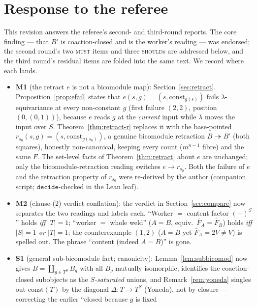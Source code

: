 \documentclass[11pt]{article}
\newcommand{\const}{\mathrm{const}}
\theoremstyle{plain}
\theoremstyle{definition}
\theoremstyle{remark}
\begin{document}
\section{Response to the referee}\label{sec:response}

This revision answers the referee's second- and third-round reports. The core finding --- that
$B'$ is coaction-closed and is the worker's reading --- was endorsed; the second round's two
\textsc{must} items and three \textsc{should}s are addressed below, and the third round's
residual items are folded into the same text. We record where each lands.

\begin{itemize}[leftmargin=1.5em]
\item \textbf{M1} (the retract $e$ is not a bicomodule map): Section~\ref{sec:retract}.
  Proposition~\ref{prop:efail} states that $e(s,g)=(s,\const_{g(s)})$ fails
  $\lambda$-equivariance at every non-constant $g$ (first failure $(2,2)$, position
  $(0,(0,1))$), because $e$ reads $g$ at the \emph{current} input while $\lambda$ moves the
  input over $S$. Theorem~\ref{thm:retract-r} replaces it with the base-pointed
  $r_{s_0}(s,g)=(s,\const_{g(s_0)})$, a genuine bicomodule retraction
  $B\twoheadrightarrow B'$ (both squares), honestly non-canonical, keeping every count
  ($m^{n-1}$ fibre) and the same $\bar F$. The set-level facts of Theorem~\ref{thm:retract}
  about $e$ are unchanged; only the bicomodule-retraction reading switches $e\to r_{s_0}$.
  Both the failure of $e$ and the retraction property of $r_{s_0}$ were re-derived by the
  author (companion script; $\mathtt{decide}$-checked in the Lean leaf).
\item \textbf{M2} (clause-(2) verdict conflation): the verdict in
  Section~\ref{sec:compare} now separates the two readings and labels each. ``Worker $=$
  content factor $(-)^S$'' holds \emph{iff $|T|=1$}; ``worker $=$ whole weld'' ($A=B$, equiv.\
  $\bar F_A=\bar F_B$) holds \emph{iff $|S|=1$ or $|T|=1$}; the counterexample $(1,2)$
  ($A=B$ yet $\bar F_A=2V\ne V$) is spelled out. The phrase ``content (indeed $A=B$)'' is
  gone.
\item \textbf{S1} (general sub-bicomodule fact; canonicity): Lemma~\ref{lem:subbicomod} now
  gives $B=\coprod_{g\in T^S}B_g$ with all $B_g$ mutually isomorphic, identifies the
  coaction-closed subobjects as the \emph{$S$-saturated} unions, and
  Remark~\ref{rem:yoneda} singles out $\const(T)$ by the diagonal $\Delta\colon T\to T^S$
  (Yoneda), not by closure --- correcting the earlier ``closed because $g$ is fixed

\end{itemize}
\end{document}
